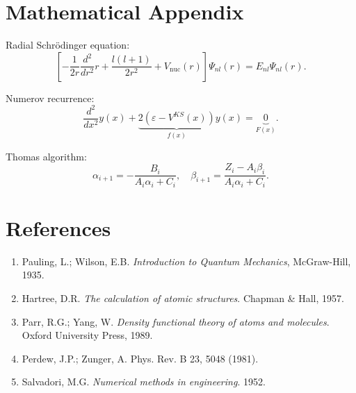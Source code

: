 \documentclass[12pt,a4paper]{article}
\begin{document}
\section{Mathematical Appendix}

Radial Schrödinger equation:
\[
\left[-\frac{1}{2r}\frac{d^2}{dr^2}r + \frac{l(l+1)}{2r^2} + V_\text{nuc}(r)\right]\Psi_{nl}(r) = E_{nl}\Psi_{nl}(r).
\]

Numerov recurrence:
\[
\frac{d^2}{d x^2} y(x)+\underbrace{2\left(\varepsilon-V^{K S}(x)\right)}_{f(x)} y(x)=\underbrace{0}_{F(x)}.
\]

Thomas algorithm:
\[
\alpha_{i+1} = -\frac{B_i}{A_i\alpha_i + C_i}, \quad
\beta_{i+1} = \frac{Z_i - A_i\beta_i}{A_i\alpha_i + C_i}.
\]

\section{References}
\begin{enumerate}
    \item Pauling, L.; Wilson, E.B. \textit{Introduction to Quantum Mechanics}, McGraw-Hill, 1935.
    \item Hartree, D.R. \textit{The calculation of atomic structures}. Chapman \& Hall, 1957.
    \item Parr, R.G.; Yang, W. \textit{Density functional theory of atoms and molecules}. Oxford University Press, 1989.
    \item Perdew, J.P.; Zunger, A. Phys. Rev. B 23, 5048 (1981).
    \item Salvadori, M.G. \textit{Numerical methods in engineering}. 1952.
\end{enumerate}
\end{document}
